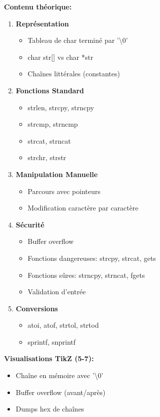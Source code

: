 \documentclass[10pt,a4paper]{article}
\begin{document}
\textbf{Contenu théorique:}
\begin{enumerate}
\item \textbf{Représentation}
   \begin{itemize}
   \item Tableau de char terminé par '\textbackslash 0'
   \item char str[] vs char *str
   \item Chaînes littérales (constantes)
   \end{itemize}

\item \textbf{Fonctions Standard}
   \begin{itemize}
   \item strlen, strcpy, strncpy
   \item strcmp, strncmp
   \item strcat, strncat
   \item strchr, strstr
   \end{itemize}

\item \textbf{Manipulation Manuelle}
   \begin{itemize}
   \item Parcours avec pointeurs
   \item Modification caractère par caractère
   \end{itemize}

\item \textbf{Sécurité}
   \begin{itemize}
   \item Buffer overflow
   \item Fonctions dangereuses: strcpy, strcat, gets
   \item Fonctions sûres: strncpy, strncat, fgets
   \item Validation d'entrée
   \end{itemize}

\item \textbf{Conversions}
   \begin{itemize}
   \item atoi, atof, strtol, strtod
   \item sprintf, snprintf
   \end{itemize}
\end{enumerate}

\textbf{Visualisations TikZ (5-7):}
\begin{itemize}
\item Chaîne en mémoire avec '\textbackslash 0'
\item Buffer overflow (avant/après)
\item Dumps hex de chaînes
\end{itemize}
\end{document}

